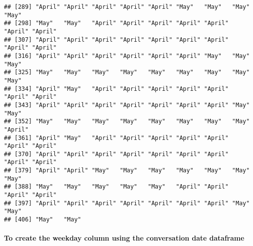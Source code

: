 \documentclass[
]{article}
\newenvironment{Shaded}{\begin{snugshade}}{\end{snugshade}}
\newcommand{\FunctionTok}[1]{\textcolor[rgb]{0.00,0.00,0.00}{#1}}
\newcommand{\NormalTok}[1]{#1}
\newcommand{\OtherTok}[1]{\textcolor[rgb]{0.56,0.35,0.01}{#1}}
\newcommand{\SpecialCharTok}[1]{\textcolor[rgb]{0.00,0.00,0.00}{#1}}
\newcommand{\StringTok}[1]{\textcolor[rgb]{0.31,0.60,0.02}{#1}}
\begin{document}
\begin{verbatim}
## [289] "April" "April" "April" "April" "April" "May"   "May"   "May"   "May"  
## [298] "May"   "May"   "April" "April" "April" "April" "April" "April" "April"
## [307] "April" "April" "April" "April" "April" "April" "April" "April" "April"
## [316] "April" "April" "April" "April" "April" "April" "May"   "May"   "May"  
## [325] "May"   "May"   "May"   "May"   "May"   "May"   "May"   "May"   "May"  
## [334] "April" "May"   "April" "April" "April" "April" "April" "April" "April"
## [343] "April" "April" "April" "April" "April" "April" "April" "May"   "May"  
## [352] "May"   "May"   "May"   "May"   "May"   "May"   "May"   "May"   "April"
## [361] "April" "May"   "April" "April" "April" "April" "April" "April" "April"
## [370] "April" "April" "April" "April" "April" "April" "April" "April" "April"
## [379] "April" "April" "May"   "May"   "May"   "May"   "May"   "May"   "May"  
## [388] "May"   "May"   "May"   "May"   "May"   "April" "April" "April" "April"
## [397] "April" "April" "April" "April" "April" "April" "April" "May"   "May"  
## [406] "May"   "May"
\end{verbatim}

\hypertarget{to-create-the-weekday-column-using-the-conversation-date-dataframe-1}{%
\paragraph{To create the weekday column using the conversation date
dataframe}\label{to-create-the-weekday-column-using-the-conversation-date-dataframe-1}}

\begin{Shaded}
\end{Shaded}
\end{document}

